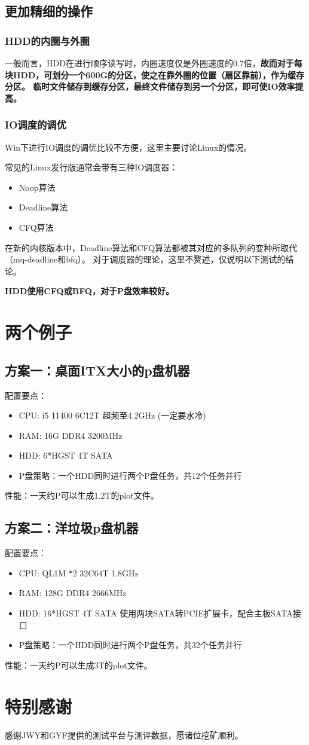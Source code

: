 \documentclass[cn,black,12pt,normal]{elegantnote}
\begin{document}
\subsection{更加精细的操作}

\subsubsection{HDD的内圈与外圈}

一般而言，HDD在进行顺序读写时，内圈速度仅是外圈速度的0.7倍，\textbf{故而对于每块HDD，可划分一个600G的分区，使之在靠外圈的位置（扇区靠前），作为缓存分区。
临时文件储存到缓存分区，最终文件储存到另一个分区，即可使IO效率提高。}

\subsubsection{IO调度的调优}

Win下进行IO调度的调优比较不方便，这里主要讨论Linux的情况。

常见的Linux发行版通常会带有三种IO调度器：
\begin{itemize}
    \item Noop算法
    \item Deadline算法
    \item CFQ算法
\end{itemize}

在新的内核版本中，Deadline算法和CFQ算法都被其对应的多队列的变种所取代（mq-deadline和bfq）。
对于调度器的理论，这里不赘述，仅说明以下测试的结论。

\textbf{HDD使用CFQ或BFQ，对于P盘效率较好。}


\section{两个例子}

\subsection{方案一：桌面ITX大小的p盘机器}
配置要点：
\begin{itemize}
    \item CPU: i5 11400 6C12T 超频至4.2GHz (一定要水冷)
    \item RAM: 16G DDR4 3200MHz
    \item HDD: 6*HGST 4T SATA
    \item P盘策略：一个HDD同时进行两个P盘任务，共12个任务并行
\end{itemize}
性能：一天约P可以生成1.2T的plot文件。

\subsection{方案二：洋垃圾p盘机器}
配置要点：
\begin{itemize}
    \item CPU: QL1M *2 32C64T 1.8GHz
    \item RAM: 128G DDR4 2666MHz
    \item HDD: 16*HGST 4T SATA 使用两块SATA转PCIE扩展卡，配合主板SATA接口
    \item P盘策略：一个HDD同时进行两个P盘任务，共32个任务并行
\end{itemize}
性能：一天约P可以生成3T的plot文件。

\section{特别感谢}

感谢JWY和GYF提供的测试平台与测评数据，愿诸位挖矿顺利。
\end{document}
